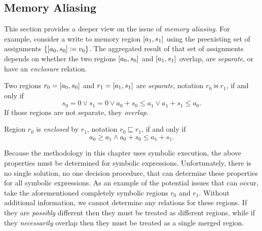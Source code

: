 \subsection{Memory Aliasing}\label{sse:memory_aliasing}
This section provides a deeper view on the issue of \emph{memory aliasing}.%
For example, consider a write to memory region $[a_1,s_1]$
using the preexisting set of assignments $\{[a_0,s_0]\coloneqq v_0\}$.
The aggregated result of that set of assignments
depends on whether the two regions $[a_0,s_0]$ and $[a_1,s_1]$
overlap, are \emph{separate}, or have an \emph{enclosure} relation.%
%
\begin{definition}
  Two regions $r_0=[a_0,s_0]$ and $r_1=[a_1,s_1]$ are \emph{separate},
  notation $r_0\bowtie r_1$, if and only if
  \begin{equation*}
  s_0=0\vee s_1=0\vee a_0+s_0\leq a_1\vee a_1+s_1\leq a_0.
  \end{equation*}
  If those regions are not separate, they \emph{overlap}.
\end{definition}
\begin{example}
  
\end{example}

\begin{definition}
  Region $r_0$ is \emph{enclosed} by $r_1$, notation $r_0\sqsubseteq r_1$,
  if and only if
  \begin{equation*}
  a_0\geq a_1\wedge a_0+s_0\leq a_1+s_1.
  \end{equation*}
\end{definition}
Because the methodology in this chapter uses symbolic execution,
the above properties must be determined for symbolic expressions.
Unfortunately, there is no single solution, no one decision procedure,
that can determine these properties for all symbolic expressions.
As an example of the potential issues that can occur,
take the aforementioned completely symbolic regions $r_0$ and $r_1$.
Without additional information, we cannot determine any relations for these regions.
If they are \emph{possibly} different then they must be treated as different regions,
while if they \emph{necessarily} overlap
then they must be treated as a single merged region.

